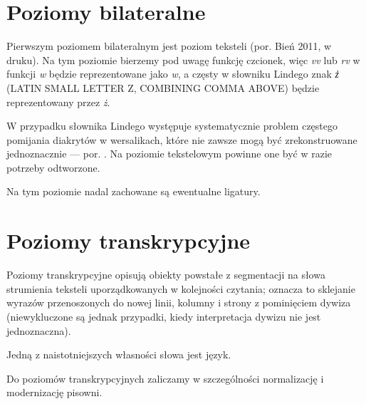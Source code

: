 \documentclass[12]{mwart}
\begin{document}
\section{Poziomy bilateralne}
\label{sec:poziomy-bilateralne}

Pierwszym poziomem bilateralnym jest poziom teksteli (por. Bień 2011,
w druku). Na tym poziomie bierzemy pod uwagę funkcję czcionek, więc
\textit{vv} lub \textit{rv} w funkcji \textit{w} będzie reprezentowane
jako \textit{w}, a częsty w słowniku Lindego znak {\setmainfont{DejaVu
    Sans}\textit{z̓}} (LATIN SMALL LETTER Z, COMBINING COMMA ABOVE)
będzie reprezentowany przez \textit{ż}.

W przypadku słownika Lindego występuje systematycznie problem częstego
pomijania diakrytów w wersalikach, które nie zawsze mogą być
zrekonstruowane jednoznacznie --- por. \citep{bc379}. Na poziomie
tekstelowym powinne one być w razie potrzeby odtworzone.

Na tym poziomie nadal zachowane są ewentualne ligatury.

\section{Poziomy transkrypcyjne}
\label{sec:pozi-transkrypcyjne}

Poziomy transkrypcyjne opisują obiekty powstałe z segmentacji na słowa
strumienia teksteli uporządkowanych w kolejności czytania; oznacza to
sklejanie wyrazów przenoszonych do nowej linii, kolumny i strony z
pominięciem dywiza (niewykluczone są jednak przypadki, kiedy
interpretacja dywizu nie jest jednoznaczna). 

Jedną z naistotniejszych własności słowa jest język.

Do poziomów transkrypcyjnych zaliczamy w szczególności normalizację i
modernizację pisowni.

\printbibliography
\end{document}
